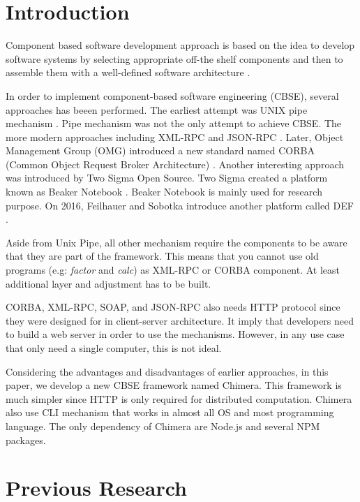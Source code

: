\documentclass[conference]{IEEEtran}
\begin{document}
\IEEEpeerreviewmaketitle

\section{Introduction}

Component based software development approach is based on the idea to develop 
software systems by selecting appropriate off-the shelf components and then to 
assemble them with a well-defined software architecture \cite{kaur2010component}.

In order to implement component-based software engineering (CBSE), several 
approaches has beeen performed. The earliest attempt was UNIX pipe mechanism 
\cite{mcilroy1968mass}. Pipe mechanism was not the only attempt to achieve CBSE.
The more modern approaches including XML-RPC \cite{xmlrpc} and JSON-RPC \cite{jsonrpc}. 
Later, Object Management Group (OMG) introduced a new standard named CORBA (Common
Object Request Broker Architecture) \cite{corba}. Another interesting approach was 
introduced by Two Sigma Open Source. Two Sigma created a platform known as Beaker
Notebook \cite{beakernotebook}. Beaker Notebook is mainly used for research purpose. 
On 2016, Feilhauer and Sobotka introduce another platform called DEF 
\cite{feilhauer2016def}.

Aside from Unix Pipe, all other mechanism require the components to be aware that 
they are part of the framework. This means that you cannot use old programs (e.g:
{\it factor} and {\it calc}) as XML-RPC or CORBA component. At least additional layer
and adjustment has to be built.

CORBA, XML-RPC, SOAP, and JSON-RPC also needs HTTP protocol since they were designed for 
in client-server architecture. It imply that developers need to build a web server in 
order to use the mechanisms. However, in any use case that only need a single computer,
this is not ideal.

Considering the advantages and disadvantages of earlier approaches, in this paper, 
we develop a new CBSE framework named Chimera. This framework is much simpler since
HTTP is only required for distributed computation. Chimera also use CLI mechanism that
works in almost all OS and most programming language.
The only dependency of Chimera are Node.js and several NPM packages.

\section{Previous Research}
\end{document}
